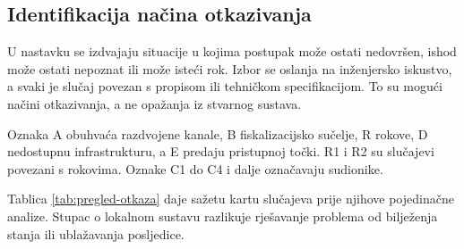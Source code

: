 \subsection{Identifikacija načina otkazivanja}
\label{sec:failure-modes}

U nastavku se izdvajaju situacije u kojima postupak može ostati nedovršen,
ishod može ostati nepoznat ili može isteći rok. Izbor se oslanja na
inženjersko iskustvo, a svaki je slučaj povezan s propisom ili tehničkom
specifikacijom. To su mogući načini otkazivanja, a ne opažanja iz stvarnog
sustava.

Oznaka A obuhvaća razdvojene kanale, B fiskalizacijsko sučelje, R rokove,
D nedostupnu infrastrukturu, a E predaju pristupnoj točki. R1 i R2 su
slučajevi povezani s rokovima. Oznake C1 do C4 i dalje označavaju sudionike.

Tablica \ref{tab:pregled-otkaza} daje sažetu kartu slučajeva prije njihove
pojedinačne analize. Stupac o lokalnom sustavu razlikuje rješavanje problema
od bilježenja stanja ili ublažavanja posljedice.

